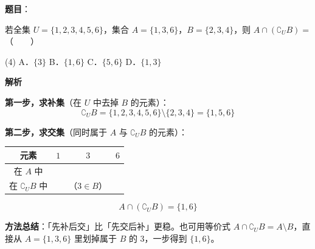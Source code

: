 \begin{answer}

\textbf{题目}：

若全集 $U=\{1,2,3,4,5,6\}$，集合 $A=\{1,3,6\}$，$B=\{2,3,4\}$，则 $A\cap\left(\complement_U B\right)=$\mbox{（　　）}

\begin{gkopts}(4)
\task A．$\{3\}$
\task B．$\{1,6\}$
\task C．$\{5,6\}$
\task D．$\{1,3\}$
\end{gkopts}

\textbf{解析}

\textbf{第一步，求补集}（在 $U$ 中去掉 $B$ 的元素）：
\nopagebreak[4]
\[\complement_U B=\{1,2,3,4,5,6\}\setminus\{2,3,4\}=\{1,5,6\}\]

\textbf{第二步，求交集}（同时属于 $A$ 与 $\complement_U B$ 的元素）：

\begin{center}
\begin{tabular}{cccc}
\toprule
元素 & $1$ & $3$ & $6$ \\
\midrule
在 $A$ 中 &  &  &  \\
在 $\complement_U B$ 中 &  & （$3\in B$） &  \\
\bottomrule
\end{tabular}
\end{center}

\nopagebreak[4]
\[A\cap\left(\complement_U B\right)=\{1,6\}\]

\begin{gktip}
\textbf{方法总结}：「先补后交」比「先交后补」更稳。也可用等价式 $A\cap\complement_U B=A\setminus B$，直接从 $A=\{1,3,6\}$ 里划掉属于 $B$ 的 $3$，一步得到 $\{1,6\}$。
\end{gktip}


\par\medskip

\end{answer}
